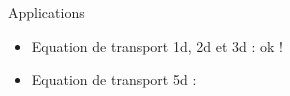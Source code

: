 \begin{frame}{Applications}
\begin{itemize}
\item Equation de transport 1d, 2d et 3d : ok !
\begin{figure}[htb]
  \centering
\end{figure}

\item Equation de transport 5d : %
\end{itemize}
\end{frame}

